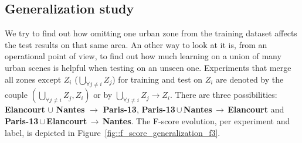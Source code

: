     \subsection{Generalization study}
        \label{subsec::more_experiments::scalability::generalization}
        We try to find out how omitting one urban zone from the training dataset affects the test results on that same area.
        An other way to look at it is, from an operational point of view, to find out how much learning on a union of many urban scenes is helpful when testing on an unseen one.
        Experiments that merge all zones except $Z_i$ ($\underset{\forall j \neq i}{\bigcup} Z_j$) for training and test on $Z_i$ are denoted by the couple $(\underset{\forall j \neq i}{\bigcup} Z_j, Z_i)$ or by $ \underset{\forall j \neq i}{\bigcup} Z_j \rightarrow Z_i$.
        There are three possibilities: \textbf{Elancourt} $\cup$ \textbf{Nantes} \(\rightarrow\) \textbf{Paris-13}, \mbox{\textbf{Paris-13}}\,$\cup$\,\textbf{Nantes}\,\(\rightarrow\)\,\textbf{Elancourt} and \mbox{\textbf{Paris-13}}\,$\cup$\,\textbf{Elancourt}\,\(\rightarrow\)\,\textbf{Nantes}.
        The F-score evolution, per experiment and label, is depicted in Figure~\ref{fig::f_score_generalization_f3}.\\
    
        \begin{figure}[htbp]
        \end{figure}

